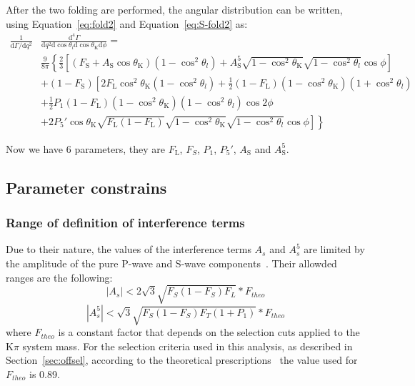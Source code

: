 After the two folding are performed, the angular distribution can be written, using  Equation~\ref{eq:fold2} and Equation~\ref{eq:S-fold2} as:
\begin{equation} \label{eq:PDF-f2}
  \begin{split}
    \frac{1}{\mathrm{d}\Gamma/\mathrm{d}q^2}&\frac{\mathrm{d}^4\Gamma}{\mathrm{d}q^2 \mathrm{d}\cos\theta_l \mathrm{d}\cos\theta_\mathrm{K} \mathrm{d}\phi} = \\
    &\frac{9}{8\pi}\left\{\frac{2}{3}\left[ (F_\mathrm{S}+A_\mathrm{S}\cos\theta_\mathrm{K})\left(1-\cos^2\theta_l\right) + A^5_\mathrm{S}\sqrt{1-\cos^2\theta_\mathrm{K}}\sqrt{1-\cos^2\theta_l}\cos\phi \right] \right.\\
    & + \left(1 - F_\mathrm{S}\right)\left[2F_\mathrm{L}\cos^2\theta_\mathrm{K}\left(1-\cos^2\theta_l\right)+\frac{1}{2}\left(1-F_\mathrm{L}\right)\left(1-\cos^2\theta_\mathrm{K}\right)\left(1+\cos^2\theta_l\right) \right.\\
      & + \frac{1}{2}P_1(1-F_\mathrm{L})(1-\cos^2\theta_\mathrm{K})(1-\cos^2\theta_l)\cos 2\phi \\
      & \left.\left. + 2P_5'\cos\theta_\mathrm{K}\sqrt{F_\mathrm{L}\left(1-F_\mathrm{L}\right)}\sqrt{1-\cos^2\theta_\mathrm{K}}\sqrt{1-\cos^2\theta_l}\cos\phi\right]\right\}
  \end{split}
\end{equation}

Now we have 6 parameters, they are $F_\mathrm{L}$, $F_S$, $P_1$, $P_5'$, $A_\mathrm{S}$ and $A^5_\mathrm{S}$.

\subsection{Parameter constrains}
\label{sec:bound}

\subsubsection{Range of definition of interference terms}
\label{sec:As5.range}
Due to their nature, the values of the interference terms $A_s$ and $A_s^5$ are limited by the amplitude of the pure P-wave and S-wave components~\cite{Genon:Swave}.
Their allowded ranges are the following:
\begin{equation} \label{eq:As.range}
  |A_s|<2\sqrt{3}\sqrt{F_S(1-F_S)F_L}*F_{theo}
\end{equation}
\begin{equation} \label{eq:As5.range}
  |A^5_s|<\sqrt{3}\sqrt{F_S(1-F_S)F_T(1+P_1)}*F_{theo}
\end{equation}
where $F_{theo}$ is a constant factor that depends on the selection cuts applied to the $\mathrm{K}\pi$ system mass.
For the selection criteria used in this analysis, as described in Section~\ref{sec:offsel}, according to the theoretical prescriptions~\cite{Genon:Swave} the value used for $F_{theo}$ is 0.89.

